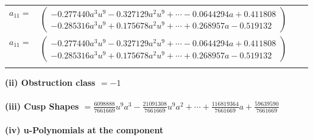 \documentclass[1p]{elsarticle_modified}
\theoremstyle{definition}
\begin{document}
\begin{tabular}{m{7pt} m{180pt} m{7pt} m{180pt} }
\flushright $a_{11}=$&$\begin{pmatrix}-0.277440 a^{3} u^{9}-0.327129 a^{2} u^{9}+\cdots-0.0644294 a+0.411808\\-0.285316 a^{3} u^{9}+0.175678 a^{2} u^{9}+\cdots+0.268957 a-0.519132\end{pmatrix}$\\ \flushright $a_{11}=$&$\begin{pmatrix}-0.277440 a^{3} u^{9}-0.327129 a^{2} u^{9}+\cdots-0.0644294 a+0.411808\\-0.285316 a^{3} u^{9}+0.175678 a^{2} u^{9}+\cdots+0.268957 a-0.519132\end{pmatrix}$\\&\end{tabular}
\flushleft \textbf{(ii) Obstruction class $= -1$}\\~\\
\flushleft \textbf{(iii) Cusp Shapes $= \frac{6098888}{7661669} u^9 a^3-\frac{21091308}{7661669} u^9 a^2+\cdots+\frac{116819364}{7661669} a+\frac{59639590}{7661669}$}\\~\\
\newpage\renewcommand{\arraystretch}{1}
\flushleft \textbf{(iv) u-Polynomials at the component}\newline \\
\end{document}

